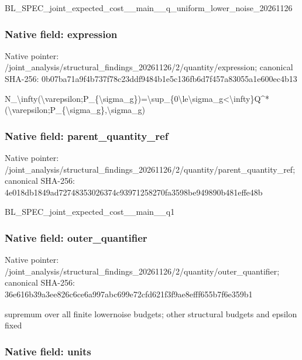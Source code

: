 \documentclass[10pt,a4paper]{article}
\begin{document}
BL\_SPEC\_joint\_expected\_c\allowbreak{}ost\_\_main\_\_q\_uniform\_low\allowbreak{}er\_noise\_20261126


\subsubsection{Native field: expression}


Native pointer: /joint\_analysis/structur\allowbreak{}al\_findings\_20261126/2/q\allowbreak{}uantity/expression; canonical SHA-256: 0b07ba71a9f4b737f78c23dd\allowbreak{}f9484b1e5c136fb6d7f457a8\allowbreak{}3055a1e600ec4b13


N\_\textbackslash{}infty(\textbackslash{}varepsilon;P\_\{\allowbreak{}\textbackslash{}sigma\_g\})=\textbackslash{}sup\_\{0\textbackslash{}le\textbackslash{}s\allowbreak{}igma\_g<\textbackslash{}infty\}Q\textasciicircum{}*(\textbackslash{}varep\allowbreak{}silon;P\_\{\textbackslash{}sigma\_g\},\textbackslash{}sig\allowbreak{}ma\_g)


\subsubsection{Native field: parent\_quantity\_ref}


Native pointer: /joint\_analysis/structur\allowbreak{}al\_findings\_20261126/2/q\allowbreak{}uantity/parent\_quantity\_\allowbreak{}ref; canonical SHA-256: 4e018db1849ad72748353026\allowbreak{}374c93971258270fa3598be9\allowbreak{}49890b481effe48b


BL\_SPEC\_joint\_expected\_cost\_\_main\_\_q1


\subsubsection{Native field: outer\_quantifier}


Native pointer: /joint\_analysis/structur\allowbreak{}al\_findings\_20261126/2/q\allowbreak{}uantity/outer\_quantifier; canonical SHA-256: 36e616b39a3ee826c6ce6a99\allowbreak{}7abc699e72cfd621f3f9ae8e\allowbreak{}fff655b7f6e359b1


supremum over all finite lowernoise budgets; other structural budgets and epsilon fixed


\subsubsection{Native field: units}
\end{document}
